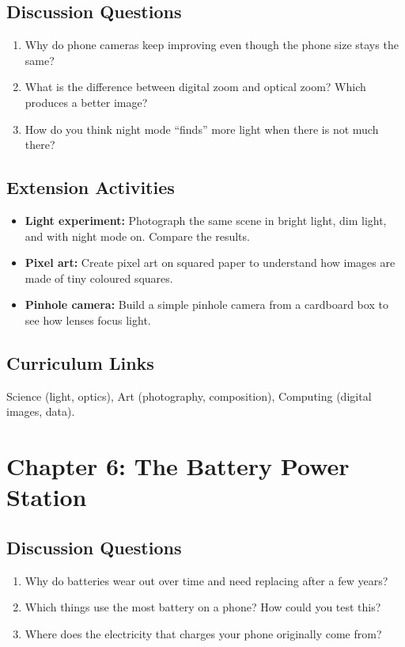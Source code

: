\subsection*{Discussion Questions}
\begin{enumerate}
  \item Why do phone cameras keep improving even though the phone size stays the same?
  \item What is the difference between digital zoom and optical zoom? Which produces a better image?
  \item How do you think night mode ``finds'' more light when there is not much there?
\end{enumerate}

\subsection*{Extension Activities}
\begin{itemize}
  \item \textbf{Light experiment:} Photograph the same scene in bright light, dim light, and with night mode on. Compare the results.
  \item \textbf{Pixel art:} Create pixel art on squared paper to understand how images are made of tiny coloured squares.
  \item \textbf{Pinhole camera:} Build a simple pinhole camera from a cardboard box to see how lenses focus light.
\end{itemize}

\subsection*{Curriculum Links}
Science (light, optics), Art (photography, composition), Computing (digital images, data).

\sectionrule

\section*{Chapter 6: The Battery Power Station}

\subsection*{Discussion Questions}
\begin{enumerate}
  \item Why do batteries wear out over time and need replacing after a few years?
  \item Which things use the most battery on a phone? How could you test this?
  \item Where does the electricity that charges your phone originally come from?
\end{enumerate}

